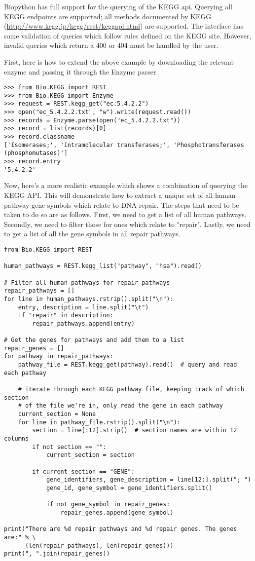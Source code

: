 Biopython has full support for the querying of the KEGG api. Querying all KEGG endpoints are supported; all methods documented by KEGG (\url{http://www.kegg.jp/kegg/rest/keggapi.html}) are supported. The interface has some validation of queries which follow rules defined on the KEGG site. However, invalid queries which return a 400 or 404 must be handled by the user.

First, here is how to extend the above example by downloading the relevant enzyme and passing it through the Enzyme parser.

\begin{verbatim}
>>> from Bio.KEGG import REST
>>> from Bio.KEGG import Enzyme
>>> request = REST.kegg_get("ec:5.4.2.2")
>>> open("ec_5.4.2.2.txt", "w").write(request.read())
>>> records = Enzyme.parse(open("ec_5.4.2.2.txt"))
>>> record = list(records)[0]
>>> record.classname
['Isomerases;', 'Intramolecular transferases;', 'Phosphotransferases (phosphomutases)']
>>> record.entry
'5.4.2.2'
\end{verbatim}

Now, here's a more realistic example which shows a combination of querying the KEGG API. This will demonstrate how to extract a unique set of all human pathway gene symbols which relate to DNA repair. The steps that need to be taken to do so are as follows. First, we need to get a list of all human pathways. Secondly, we need to filter those for ones which relate to "repair". Lastly, we need to get a list of all the gene symbols in all repair pathways.

\begin{verbatim}
from Bio.KEGG import REST

human_pathways = REST.kegg_list("pathway", "hsa").read()

# Filter all human pathways for repair pathways
repair_pathways = []
for line in human_pathways.rstrip().split("\n"):
    entry, description = line.split("\t")
    if "repair" in description:
        repair_pathways.append(entry)

# Get the genes for pathways and add them to a list
repair_genes = [] 
for pathway in repair_pathways:
    pathway_file = REST.kegg_get(pathway).read()  # query and read each pathway

    # iterate through each KEGG pathway file, keeping track of which section
    # of the file we're in, only read the gene in each pathway
    current_section = None
    for line in pathway_file.rstrip().split("\n"):
        section = line[:12].strip()  # section names are within 12 columns
        if not section == "":
            current_section = section
        
        if current_section == "GENE":
            gene_identifiers, gene_description = line[12:].split("; ")
            gene_id, gene_symbol = gene_identifiers.split()

            if not gene_symbol in repair_genes:
                repair_genes.append(gene_symbol)

print("There are %d repair pathways and %d repair genes. The genes are:" % \
      (len(repair_pathways), len(repair_genes)))
print(", ".join(repair_genes))
\end{verbatim}

